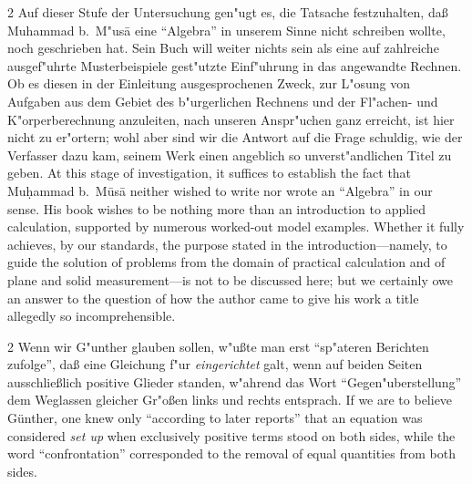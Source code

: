 \documentclass[10pt,a4paper]{article}
\renewcommand{\switchcolumn}{\syncronize\nointerlineskip\columnbreak}
\newcommand{\enquote}[1]{``#1''}
\begin{document}
\begin{paracol}{2}
Auf dieser Stufe der Untersuchung gen"ugt es, die Tatsache festzuhalten, da\ss{} Muhammad b.\ M"us\=a eine \enquote{Algebra} in unserem Sinne nicht schreiben wollte, noch geschrieben hat. Sein Buch will weiter nichts sein als eine auf zahlreiche ausgef"uhrte Musterbeispiele gest"utzte Einf"uhrung in das angewandte Rechnen. Ob es diesen in der Einleitung ausgesprochenen Zweck, zur L"osung von Aufgaben aus dem Gebiet des b"urgerlichen Rechnens und der Fl"achen- und K"orperberechnung anzuleiten, nach unseren Anspr"uchen ganz erreicht, ist hier nicht zu er"ortern; wohl aber sind wir die Antwort auf die Frage schuldig, wie der Verfasser dazu kam, seinem Werk einen angeblich so unverst"andlichen Titel zu geben.
\switchcolumn
At this stage of investigation, it suffices to establish the fact that Mu\d{h}ammad b.\ M\=us\=a neither wished to write nor wrote an ``Algebra'' in our sense. His book wishes to be nothing more than an introduction to applied calculation, supported by numerous worked-out model examples. Whether it fully achieves, by our standards, the purpose stated in the introduction---namely, to guide the solution of problems from the domain of practical calculation and of plane and solid measurement---is not to be discussed here; but we certainly owe an answer to the question of how the author came to give his work a title allegedly so incomprehensible.
\end{paracol}

\begin{paracol}{2}
Wenn wir G"unther glauben sollen, w"u\ss{}te man erst \enquote{sp"ateren Berichten zufolge}, da\ss{} eine Gleichung f"ur \textit{eingerichtet} galt, wenn auf beiden Seiten ausschlie\ss{}lich positive Glieder standen, w"ahrend das Wort \enquote{Gegen"uberstellung} dem Weglassen gleicher Gr"o\ss{}en links und rechts entsprach.
\switchcolumn
If we are to believe G\"unther, one knew only ``according to later reports'' that an equation was considered \textit{set up} when exclusively positive terms stood on both sides, while the word ``confrontation'' corresponded to the removal of equal quantities from both sides.
\end{paracol}
\end{document}
